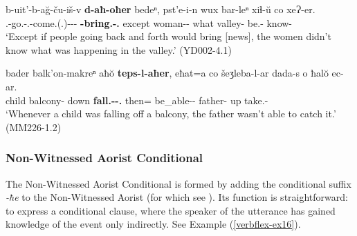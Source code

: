 \begin{exe}
	\ex\label{verbflex-ex15}
	\begin{xlist}
		
		\ex\label{verbflex-ex15a}
		\gll b-uit'-b-a\u{g}-ču-iš-v \textbf{d-aħ-oħer} bedeⁿ, pst'e-i-n wux bar-leⁿ xiɬ-\u{u} co xeɁ-er. \\
		{\M}.{\Pl}-go.{\Ipfv}-{\M}.{\Pl}-come.{\Ipfv}({\Ptcp}.{\Npst})-{\Obl}-{\Pl}-{\Erg} \textbf{{\D}-bring.{\Pfv}-{\Cond}.{\Pst}} except woman-{\Pl}-{\Dat} what valley-{\Abl} be.{\Pfv}-{\Npst} {\Neg} know-{\Imprf} \\
		\trans `Except if people going back and forth would bring [news], the women didn't know what was happening in the valley.'
		\hfill (YD002-4.1)
		
		\ex\label{verbflex-ex15b}
		\gll bader balk'on-makreⁿ aħ\u{o} \textbf{teps-l-aħer}, eħat=a co šeʒleba-l-ar dada-s o ħal\u{o} ec-ar. \\
		child balcony-{\Superabl} down \textbf{fall.{\Ipfv}-{\Intr}-{\Cond}.{\Pst}} then={\Emph} {\Neg} be\_able-{\Intr}-{\Imprf} father-{\Erg} {\Dist} up take.{\Pfv}-{\Vn} \\
		\trans `Whenever a child was falling off a balcony, the father wasn't able to catch it.'
		\hfill (MM226-1.2)
		
	\end{xlist}
\end{exe}

\subsubsection{Non-Witnessed Aorist Conditional}

The Non-Witnessed Aorist Conditional is formed by adding the conditional suffix \textit{-ħe} to the Non-Witnessed Aorist (for which see ). Its function is straightforward: to express a conditional clause, where the speaker of the utterance has gained knowledge of the event only indirectly. See Example (\ref{verbflex-ex16}).\largerpage



